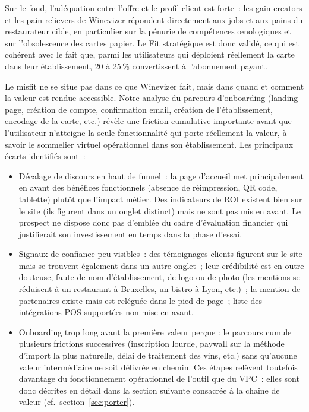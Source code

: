 \documentclass[12pt, a4paper]{article}
\begin{document}
Sur le fond, l'adéquation entre l'offre et le profil client est forte~: les gain
creators et les pain relievers de Winevizer répondent directement aux
jobs et aux pains du restaurateur cible, en particulier sur la pénurie
de compétences œnologiques et sur l'obsolescence des cartes papier. Le Fit
stratégique est donc validé, ce qui est cohérent avec le fait que, parmi les
utilisateurs qui déploient réellement la carte dans leur établissement, 20 à 25\,\%
convertissent à l'abonnement payant.

Le misfit ne se situe pas dans ce que Winevizer fait, mais dans quand
et comment la valeur est rendue accessible. Notre analyse du parcours
d'onboarding (landing page, création de compte, confirmation email, création de
l'établissement, encodage de la carte, etc.) révèle une friction
cumulative importante avant que l'utilisateur n'atteigne la seule fonctionnalité qui
porte réellement la valeur, à savoir le sommelier virtuel opérationnel dans son établissement.
Les principaux écarts identifiés sont~:

\begin{itemize}[leftmargin=1.5em]
  \item Décalage de discours en haut de funnel~: la page d'accueil met principalement
        en avant des bénéfices fonctionnels (absence de réimpression, QR code, tablette)
        plutôt que l'impact métier. Des indicateurs de ROI existent bien sur le site
        (ils figurent dans un onglet distinct) mais ne sont pas mis en avant.
        Le prospect ne dispose donc pas d'emblée du cadre d'évaluation financier qui
        justifierait son investissement en temps dans la phase d'essai.

  \item Signaux de confiance peu visibles~: des témoignages clients figurent sur le
        site mais se trouvent également dans un autre onglet~; leur crédibilité est en outre
        douteuse, faute de nom d'établissement, de logo ou de photo (les mentions se
        réduisent à \og{}un restaurant à Bruxelles\fg{}, \og{}un bistro à Lyon\fg{}, etc.)~;
        la mention de partenaires existe mais est reléguée dans le pied de page~; liste des
        intégrations POS supportées non mise en avant.

  \item Onboarding trop long avant la première valeur perçue : le parcours cumule
        plusieurs frictions successives (inscription lourde, paywall sur la méthode
        d'import la plus naturelle, délai de traitement des vins, etc.) sans qu'aucune 
        valeur intermédiaire ne soit délivrée en chemin. Ces étapes relèvent toutefois 
        davantage du fonctionnement opérationnel
        de l'outil que du VPC~: elles sont donc décrites en détail dans la section
        suivante consacrée à la chaîne de valeur (cf.~section~\ref{sec:porter}).

\end{itemize}
\end{document}
